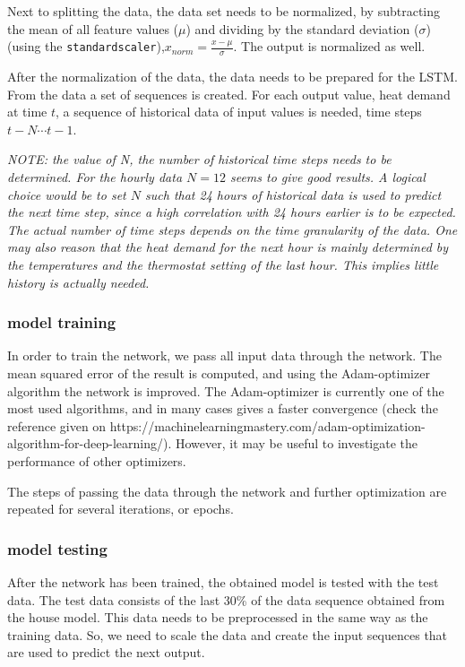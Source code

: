 Next to splitting the data, the data set needs to be normalized, by subtracting the mean of all feature values ($\mu$) and dividing by the standard deviation ($\sigma$) (using the \texttt{standardscaler}),$x_{norm}= \frac{x-\mu}{\sigma}$. The output is normalized as well.

After the normalization of the data, the data needs to be prepared for the LSTM. From the data a set of sequences is created. For each output value, heat demand at time $t$, a sequence of historical data of input values is needed, time steps $t-N \cdots t-1$.  

\textit{NOTE: the value of N, the number of historical time steps needs to be determined. For the hourly data $N=12$ seems to give good results. A logical choice would be to set $N$ such that 24 hours of historical data is used to predict the next time step, since a high correlation with 24 hours earlier is to be expected. The actual number of time steps depends on the time granularity of the data. 
One may also reason that the heat demand for the next hour is mainly determined by the temperatures and the thermostat setting of the last hour. This implies little history is actually needed.} 

\subsubsection{model training}
In order to train the network, we pass all input data through the network. The mean squared error of the result is computed, and using the Adam-optimizer algorithm the network is improved. The Adam-optimizer is currently one of the most used algorithms, and in many cases gives a faster convergence (check the reference given on https://machinelearningmastery.com/adam-optimization-algorithm-for-deep-learning/). However, it may be useful to investigate the performance of other optimizers.
 
The steps of passing the data through the network and further optimization are repeated for several iterations, or epochs.
 
%
%


\subsubsection{model testing}
After the network has been trained, the obtained model is tested with the test data. The test data consists of the last 30\% of the data sequence obtained from the house model. This data needs to be preprocessed in the same way as the training data. So, we need to scale the data and create the input sequences that are used to predict the next output. 

